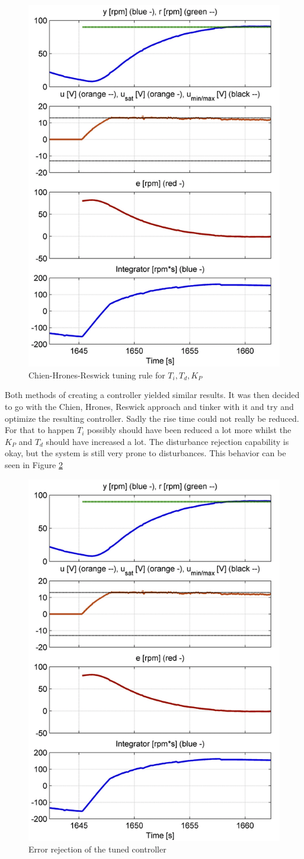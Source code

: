 \begin{figure}[H]
\begin{center}
\includegraphics[width=0.5\linewidth]{images/general/PID/Chien_Hrones_Reswick}
\end{center}
\caption{Chien-Hrones-Reswick tuning rule for $T_{i}, T_{d},K_{P}$}
\label{fig:Chien_Hrones_Reswick}
\end{figure}

Both methods of creating a controller yielded similar results. It was then decided to go with the Chien, Hrones, Reswick approach and tinker with it and try and optimize the resulting controller.
Sadly the rise time could not really be reduced. For that to happen $T_i$ possibly should have been reduced a lot more whilst the $K_P$ and $T_d$ should have increased a lot.
The disturbance rejection capability is okay, but the system is still very prone to disturbances. This behavior can be seen in Figure \ref{fig:error_rejection}

\begin{figure}[H]
\begin{center}
\includegraphics[width=0.5\linewidth]{images/general/PID/Chien_Hrones_Reswick}
\end{center}
\caption{Error rejection of the tuned controller}
\label{fig:error_rejection}
\end{figure}